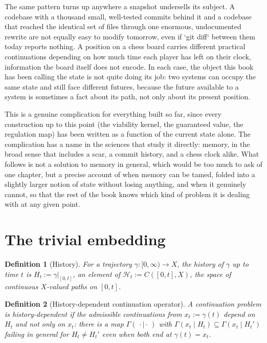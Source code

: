 \documentclass[11pt]{report}
\newtheorem{definition}{Definition}[chapter]
\begin{document}
The same pattern turns up anywhere a snapshot undersells its subject. A
codebase with a thousand small, well-tested commits behind it and a
codebase that reached the identical set of files through one enormous,
undocumented rewrite are not equally easy to modify tomorrow, even if
`git diff` between them today reports nothing. A position on a chess
board carries different practical continuations depending on how much
time each player has left on their clock, information the board itself
does not encode. In each case, the object this book has been calling
the state is not quite doing its job: two systems can occupy the same
state and still face different futures, because the future available
to a system is sometimes a fact about its path, not only about its
present position.

This is a genuine complication for everything built so far, since every
construction up to this point (the viability kernel, the guaranteed
value, the regulation map) has been written as a function of the
current state alone. The complication has a name in the sciences that
study it directly: memory, in the broad sense that includes a scar,
a commit history, and a chess clock alike. What follows is not a
solution to memory in general, which would be too much to ask of one
chapter, but a precise account of when memory can be tamed, folded
into a slightly larger notion of state without losing anything, and
when it genuinely cannot, so that the rest of the book knows which kind
of problem it is dealing with at any given point.

\section*{The trivial embedding}

\begin{definition}[History]
For a trajectory $\gamma : [0,\infty) \to X$, the history of $\gamma$
up to time $t$ is $H_t := \gamma|_{[0,t]}$, an element of
$\mathcal{H}_t := C([0,t], X)$, the space of continuous $X$-valued
paths on $[0,t]$.
\end{definition}

\begin{definition}[History-dependent continuation operator]
A continuation problem is history-dependent if the admissible
continuations from $x_t := \gamma(t)$ depend on $H_t$ and not only on
$x_t$: there is a map $\Gamma(\,\cdot \mid \cdot\,)$ with
$\Gamma(x_t \mid H_t) \subseteq \Gamma(x_t \mid H_t')$ failing in
general for $H_t \neq H_t'$ even when both end at $\gamma(t) = x_t$.
\end{definition}
\end{document}
